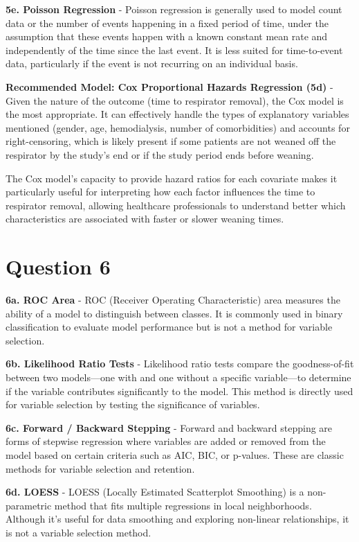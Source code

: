 \documentclass{article}
\begin{document}
\textbf{5e. Poisson Regression}
- Poisson regression is generally used to model count data or the number of events happening in a fixed period of time, under the assumption that these events happen with a known constant mean rate and independently of the time since the last event. It is less suited for time-to-event data, particularly if the event is not recurring on an individual basis.

\textbf{Recommended Model: Cox Proportional Hazards Regression (5d)}
- Given the nature of the outcome (time to respirator removal), the Cox model is the most appropriate. It can effectively handle the types of explanatory variables mentioned (gender, age, hemodialysis, number of comorbidities) and accounts for right-censoring, which is likely present if some patients are not weaned off the respirator by the study's end or if the study period ends before weaning.

The Cox model's capacity to provide hazard ratios for each covariate makes it particularly useful for interpreting how each factor influences the time to respirator removal, allowing healthcare professionals to understand better which characteristics are associated with faster or slower weaning times.

\section{Question 6}
\textbf{6a. ROC Area}
- ROC (Receiver Operating Characteristic) area measures the ability of a model to distinguish between classes. It is commonly used in binary classification to evaluate model performance but is not a method for variable selection.

\textbf{ 6b. Likelihood Ratio Tests}
- Likelihood ratio tests compare the goodness-of-fit between two models—one with and one without a specific variable—to determine if the variable contributes significantly to the model. This method is directly used for variable selection by testing the significance of variables.

\textbf{6c. Forward / Backward Stepping}
- Forward and backward stepping are forms of stepwise regression where variables are added or removed from the model based on certain criteria such as AIC, BIC, or p-values. These are classic methods for variable selection and retention.

\textbf{6d. LOESS}
- LOESS (Locally Estimated Scatterplot Smoothing) is a non-parametric method that fits multiple regressions in local neighborhoods. Although it's useful for data smoothing and exploring non-linear relationships, it is not a variable selection method.
\end{document}
